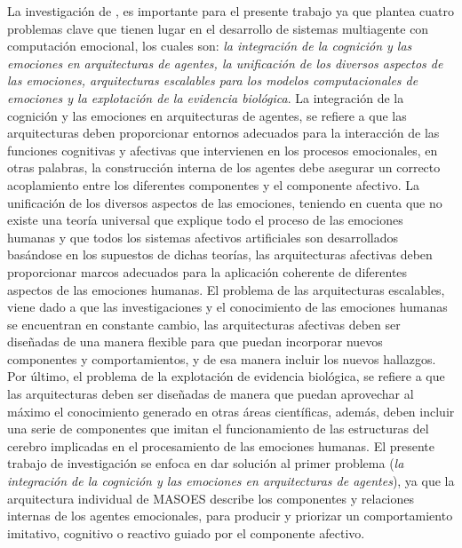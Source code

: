 %
%
%



La investigación de \cite{rodriguez2015}, es importante para el presente
trabajo ya que plantea cuatro problemas clave que tienen lugar en el desarrollo
de sistemas multiagente con computación emocional, los cuales son: \textit{la
integración de la cognición y las emociones en arquitecturas de agentes, la
unificación de los diversos aspectos de las emociones, arquitecturas escalables
para los modelos computacionales de emociones y la explotación de la evidencia
biológica}. La integración de la cognición y las emociones en arquitecturas de
agentes, se refiere a que las arquitecturas deben proporcionar entornos
adecuados para la interacción de las funciones cognitivas y afectivas que
intervienen en los procesos emocionales, en otras palabras, la construcción
interna de los agentes debe asegurar un correcto acoplamiento entre los
diferentes componentes y el componente afectivo. La unificación de los diversos
aspectos de las emociones, teniendo en cuenta que no existe una teoría universal
que explique todo el proceso de las emociones humanas y que todos los sistemas
afectivos artificiales son desarrollados basándose en los supuestos de dichas
teorías, las arquitecturas afectivas deben proporcionar marcos adecuados para la
aplicación coherente de diferentes aspectos de las emociones humanas. El
problema de las arquitecturas escalables, viene dado a que las investigaciones y
el conocimiento de las emociones humanas se encuentran en constante cambio, las
arquitecturas afectivas deben ser diseñadas de una manera flexible para que
puedan incorporar nuevos componentes y comportamientos, y de esa manera incluir
los nuevos hallazgos. Por último, el problema de la explotación de evidencia
biológica, se refiere a que las arquitecturas deben ser diseñadas de manera que
puedan aprovechar al máximo el conocimiento generado en otras áreas científicas,
además, deben incluir una serie de componentes que imitan el funcionamiento de
las estructuras del cerebro implicadas en el procesamiento de las emociones
humanas. El presente trabajo de investigación
se enfoca en dar solución al primer problema (\textit{la
integración de la cognición y las emociones en arquitecturas de agentes}),
ya que la arquitectura individual de MASOES
describe los componentes y relaciones internas de los agentes emocionales,
para producir y priorizar un comportamiento imitativo, cognitivo o reactivo
guiado por el componente afectivo.

